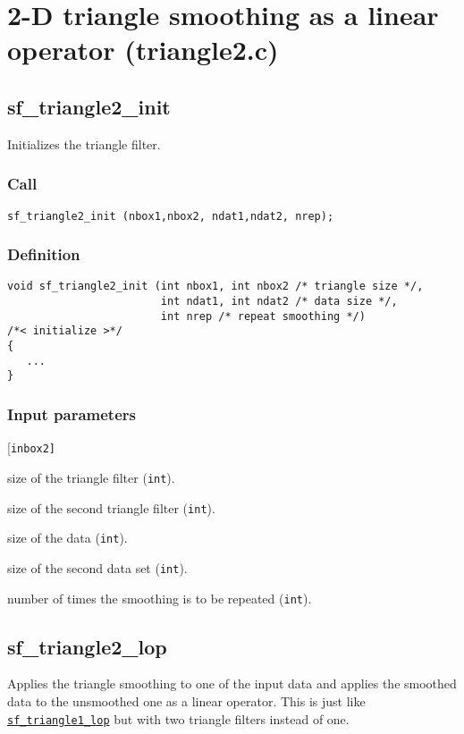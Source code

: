 \section{2-D triangle smoothing as a linear operator (triangle2.c)}




\subsection{{sf\_triangle2\_init}}
Initializes the triangle filter.

\subsubsection*{Call}
\begin{verbatim}sf_triangle2_init (nbox1,nbox2, ndat1,ndat2, nrep);\end{verbatim}

\subsubsection*{Definition}
\begin{verbatim}
void sf_triangle2_init (int nbox1, int nbox2 /* triangle size */, 
                        int ndat1, int ndat2 /* data size */,
                        int nrep /* repeat smoothing */)
/*< initialize >*/
{
   ...
}
\end{verbatim}

\subsubsection*{Input parameters}
\begin{desclist}{\tt }{\quad}[\tt inbox2]
   \setlength\itemsep{0pt}
   \item[inbox1] size of the triangle filter (\texttt{int}). 
   \item[inbox2] size of the second triangle filter (\texttt{int}). 
   \item[ndat1]  size of the data (\texttt{int}). 
   \item[ndat2]  size of the second data set (\texttt{int}). 
   \item[nrep]   number of times the smoothing is to be repeated (\texttt{int}).
\end{desclist}




\subsection{{sf\_triangle2\_lop}}
Applies the triangle smoothing to one of the input data and applies the smoothed data to the unsmoothed one as a linear operator. This is just like \hyperref[sec:sf_triangle1_lop]{\texttt{sf\_triangle1\_lop}} but with two triangle filters instead of one.

